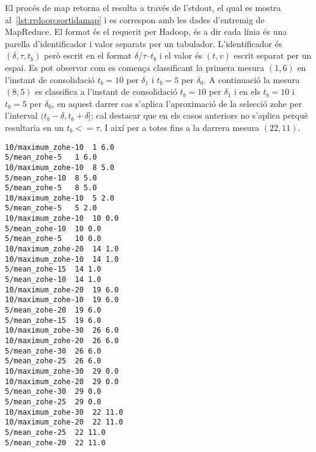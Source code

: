 El procés de map retorna el resulta a través de l'stdout, el qual es
mostra al~\autoref{lst:rrdoop:sortidamap} i es correspon amb les dades
d'entremig de MapReduce. El format és el requerit per Hadoop, és a dir
cada línia és una parella d'identificador i valor separats per un
tabulador. L'identificador és $(\delta,\tau,t_b)$ però escrit en el
format $\delta$/$\tau$--$t_b$ i el valor és $(t,v)$ escrit separat per
un espai. Es pot observar com es comença classificant la primera
mesura $(1,6)$ en l'instant de consolidació $t_b=10$ per $\delta_1$ i
$t_b=5$ per $\delta_0$.  A continuació la mesura $(8,5)$ es classifica
a l'instant de consolidació $t_b=10$ per $\delta_1$ i en els $t_b=10$
i $t_b=5$ per $\delta_0$, en aquest darrer cas s'aplica l'aproximació
de la selecció \gls{zohe} per l'interval $(t_b-\delta,t_b+\delta]$;
cal destacar que en els casos anteriors no s'aplica perquè resultaria en
un $t_b<= \tau$.  I així per a totes fins a la darrera mesura
$(22,11)$.
\begin{lstlisting}[style=stdout,caption=Sortida del procés map,label=lst:rrdoop:sortidamap]
10/maximum_zohe-10	1 6.0
5/mean_zohe-5	1 6.0
10/maximum_zohe-10	8 5.0
5/mean_zohe-10	8 5.0
5/mean_zohe-5	8 5.0
10/maximum_zohe-10	5 2.0
5/mean_zohe-5	5 2.0
10/maximum_zohe-10	10 0.0
5/mean_zohe-10	10 0.0
5/mean_zohe-5	10 0.0
10/maximum_zohe-20	14 1.0
10/maximum_zohe-10	14 1.0
5/mean_zohe-15	14 1.0
5/mean_zohe-10	14 1.0
10/maximum_zohe-20	19 6.0
10/maximum_zohe-10	19 6.0
5/mean_zohe-20	19 6.0
5/mean_zohe-15	19 6.0
10/maximum_zohe-30	26 6.0
10/maximum_zohe-20	26 6.0
5/mean_zohe-30	26 6.0
5/mean_zohe-25	26 6.0
10/maximum_zohe-30	29 0.0
10/maximum_zohe-20	29 0.0
5/mean_zohe-30	29 0.0
5/mean_zohe-25	29 0.0
10/maximum_zohe-30	22 11.0
10/maximum_zohe-20	22 11.0
5/mean_zohe-25	22 11.0
5/mean_zohe-20	22 11.0
\end{lstlisting}


